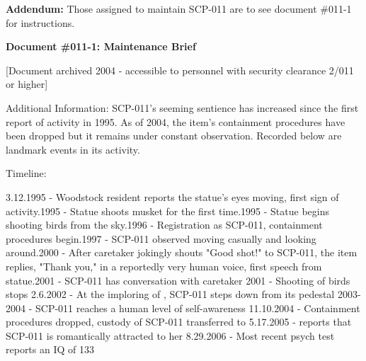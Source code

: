 \textbf{Addendum:} Those assigned to maintain SCP-011 are to see document \#011-1 for instructions.

\begin{leftbar}
\textbf{Document \#011-1: Maintenance Brief}

[Document archived 2004 - accessible to personnel with security clearance 2/011 or higher]

Additional Information: SCP-011's seeming sentience has increased since the first report of activity in 1995. As of 2004, the item's containment procedures have been dropped but it remains under constant observation. Recorded below are landmark events in its activity.

Timeline:
\begin{flushleft}
3.12.1995 - Woodstock resident reports the statue's eyes moving, first sign of activity.1995 - Statue shoots musket for the first time.1995 - Statue begins shooting birds from the sky.1996 - Registration as SCP-011, containment procedures begin.1997 - SCP-011 observed moving casually and looking around.2000 - After caretaker   jokingly shouts "Good shot!" to SCP-011, the item replies, "Thank you," in a reportedly very human voice, first speech from statue.2001 - SCP-011 has conversation with caretaker  
2001 - Shooting of birds stops
2.6.2002 - At the imploring of  , SCP-011 steps down from its pedestal
2003-2004 - SCP-011 reaches a human level of self-awareness
11.10.2004 - Containment procedures dropped, custody of SCP-011 transferred to  
5.17.2005 -   reports that SCP-011 is romantically attracted to her
8.29.2006 - Most recent psych test reports an IQ of 133
\end{flushleft}
\end{leftbar}